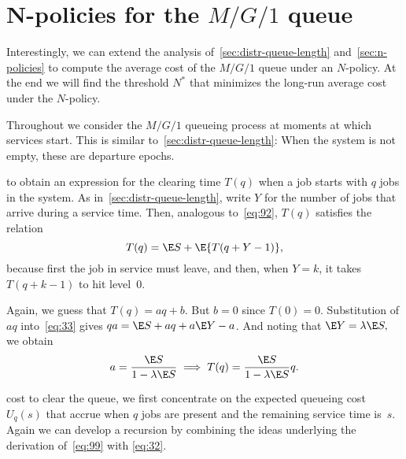


\section{N-policies for the $M/G/1$ queue}
\label{sec:n-policies-mg1}

Interestingly, we can extend the analysis of~\cref{sec:distr-queue-length} and~\cref{sec:n-policies} to compute the average cost of the $M/G/1$ queue under an $N$-policy.
At the end we will find the threshold $N^*$ that minimizes the long-run average cost under the $N$-policy.

Throughout we consider the $M/G/1$ queueing process at moments at which services start.
This is similar to~\cref{sec:distr-queue-length}: When the system is not empty, these are departure epochs.


 to obtain an expression for the clearing time $T(q)$ when a job starts with $q$ jobs in the system.
As in~\cref{sec:distr-queue-length}, write $Y$ for the number of jobs that arrive during a service time.
Then, analogous to~\cref{eq:92}, $T(q)$ satisfies the relation
\begin{equation}\label{eq:33}
  T(q) = \E S + \E{T(q+Y-1)},
\end{equation}
because first the job in service must leave, and then,  when $Y=k$,  it takes $T(q+k-1)$ to hit level~$0$.

Again, we guess that $T(q) = a q + b$.
But $b=0$ since $T(0)=0$.
Substitution of $a q$ into~\cref{eq:33} gives $q a =\E S + aq + a\E Y - a$. And noting that $\E Y = \lambda \E S,$ we  obtain
\begin{equation*}
a = \frac{\E S}{1-\lambda \E S} \implies T(q) = \frac{\E S}{1-\lambda \E S}q.
\end{equation*}

 cost to clear the queue, we first concentrate on the expected queueing cost $U_{q}(s)$ that accrue when $q$ jobs are present and the remaining service time is~$s$.
Again we can develop a recursion by combining the ideas underlying the derivation of~\cref{eq:99} with \cref{eq:32}.

